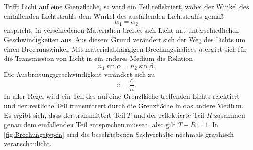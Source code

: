 Trifft Licht auf eine Grenzfläche, so wird ein Teil reflektiert, wobei der Winkel des einfallenden Lichtstrahls dem Winkel
des ausfallenden Lichtstrahls gemäß
\begin{equation}
    \alpha_1 = \alpha_2 \label{eq:Reflexion}
\end{equation}
enspricht.
In verschiedenen Materialien breitet sich Licht mit unterschiedlichen Geschwindigkeiten aus. Aus diesem Grund verändert sich
der Weg des Lichts um einen Brechunswinkel. Mit materialabhängigen Brechungsindices $n$ ergibt sich für die Transmission
von Licht in ein anderes Medium die Relation
\begin{equation}
    n_1\sin\alpha = n_2\sin\beta. \label{eq:Transmission}
\end{equation}
Die Ausbreitungsgeschwindigkeit verändert sich zu
\begin{equation}
    v = \frac{c}{n}. \label{eq:Ausbreitungsgeschwindigkeit}
\end{equation}
In aller Regel wird ein Teil des auf eine Grenzfläche treffenden Lichts relektiert und der restliche Teil transmittert durch die 
Grenzfläche in das andere Medium. Es ergibt sich, dass der transmittert Teil $T$ und der reflektierte Teil $R$ zusammen genau
dem einfallenden Teil entsprechen müssen, also gilt $T + R = 1$.
In \autoref{fig:Brechungstypen} sind die beschriebenen Sachverhalte nochmals graphisch veranschaulicht.
